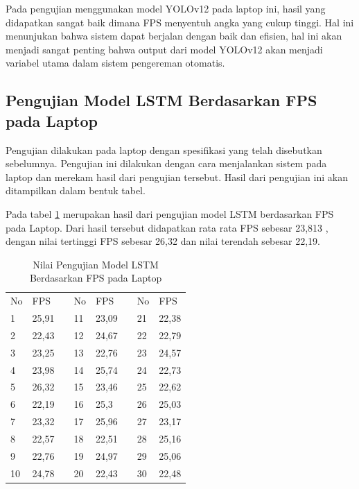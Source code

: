 Pada pengujian menggunakan model YOLOv12 pada laptop ini, hasil yang didapatkan sangat baik dimana FPS menyentuh angka yang cukup tinggi. Hal ini menunjukan bahwa sistem dapat berjalan dengan baik dan efisien, hal ini akan menjadi sangat penting bahwa output dari model YOLOv12 akan menjadi variabel utama dalam sistem pengereman otomatis.

\subsection{Pengujian Model LSTM Berdasarkan FPS pada Laptop}

Pengujian dilakukan pada laptop dengan spesifikasi yang telah disebutkan sebelumnya. Pengujian ini dilakukan dengan cara menjalankan sistem pada laptop dan merekam hasil dari pengujian tersebut. Hasil dari pengujian ini akan ditampilkan dalam bentuk tabel.

Pada tabel \ref{tb:TabelLSTMLaptop} merupakan hasil dari pengujian model LSTM berdasarkan FPS pada Laptop. Dari hasil tersebut didapatkan rata rata FPS sebesar 23,813 , dengan nilai tertinggi FPS sebesar 26,32 dan nilai terendah sebesar 22,19.


\begin{table}[H]
  \centering
  \caption{Nilai Pengujian Model LSTM Berdasarkan FPS pada Laptop} 
  \label{tb:TabelLSTMLaptop}
  \begin{tabular}{|l|l|l|l|l|l|l|l|}
  \cline{1-2} \cline{4-5} \cline{7-8}
  No & FPS   &  & No & FPS   &  & No & FPS   \\ \cline{1-2} \cline{4-5} \cline{7-8} 
  1  & 25,91 &  & 11 & 23,09 &  & 21 & 22,38 \\ \cline{1-2} \cline{4-5} \cline{7-8} 
  2  & 22,43 &  & 12 & 24,67 &  & 22 & 22,79 \\ \cline{1-2} \cline{4-5} \cline{7-8} 
  3  & 23,25 &  & 13 & 22,76 &  & 23 & 24,57 \\ \cline{1-2} \cline{4-5} \cline{7-8} 
  4  & 23,98 &  & 14 & 25,74 &  & 24 & 22,73 \\ \cline{1-2} \cline{4-5} \cline{7-8} 
  5  & 26,32 &  & 15 & 23,46 &  & 25 & 22,62 \\ \cline{1-2} \cline{4-5} \cline{7-8} 
  6  & 22,19 &  & 16 & 25,3  &  & 26 & 25,03 \\ \cline{1-2} \cline{4-5} \cline{7-8} 
  7  & 23,32 &  & 17 & 25,96 &  & 27 & 23,17 \\ \cline{1-2} \cline{4-5} \cline{7-8} 
  8  & 22,57 &  & 18 & 22,51 &  & 28 & 25,16 \\ \cline{1-2} \cline{4-5} \cline{7-8} 
  9  & 22,76 &  & 19 & 24,97 &  & 29 & 25,06 \\ \cline{1-2} \cline{4-5} \cline{7-8} 
  10 & 24,78 &  & 20 & 22,43 &  & 30 & 22,48 \\ \cline{1-2} \cline{4-5} \cline{7-8} 
  \end{tabular}
\end{table}

